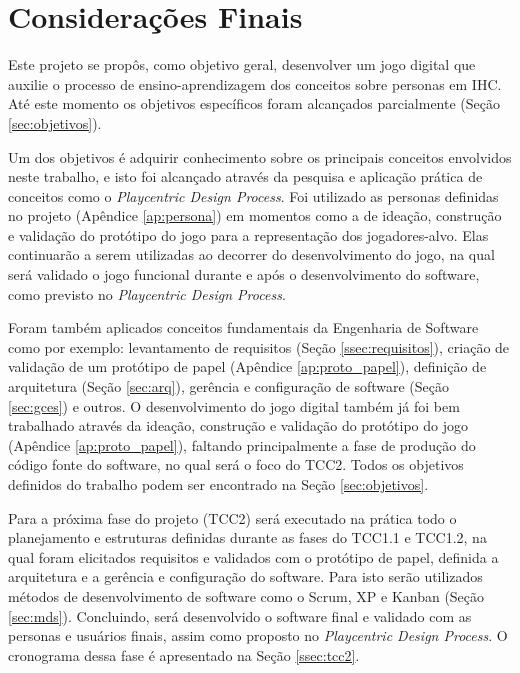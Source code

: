 {\color{textadded}
\chapter{Considerações Finais}
\label{chap:cons}

Este projeto se propôs, como objetivo geral, desenvolver um jogo digital que auxilie o processo de ensino-aprendizagem dos conceitos sobre personas em IHC. Até este momento os objetivos específicos foram alcançados parcialmente (Seção \ref{sec:objetivos}). 

Um dos objetivos é adquirir conhecimento sobre os principais conceitos envolvidos neste trabalho, e isto foi alcançado através da pesquisa e aplicação prática de conceitos como o \textit{Playcentric Design Process}. Foi utilizado as personas definidas no projeto (Apêndice \ref{ap:persona}) em momentos como a de ideação, construção e validação do protótipo do jogo para a representação dos jogadores-alvo. Elas continuarão a serem utilizadas ao decorrer do desenvolvimento do jogo, na qual será validado o jogo funcional durante e após o desenvolvimento do software, como previsto no \textit{Playcentric Design Process}. 

Foram também aplicados conceitos fundamentais da Engenharia de Software como por exemplo: levantamento de requisitos (Seção \ref{ssec:requisitos}), criação de validação de um protótipo de papel (Apêndice \ref{ap:proto_papel}), definição de arquitetura (Seção \ref{sec:arq}), gerência e configuração de software (Seção \ref{sec:gces}) e outros. O desenvolvimento do jogo digital também já foi bem trabalhado através da ideação, construção e validação do protótipo do jogo (Apêndice \ref{ap:proto_papel}), faltando principalmente a fase de produção do código fonte do software, no qual será o foco do TCC2. Todos os objetivos definidos do trabalho podem ser encontrado na Seção \ref{sec:objetivos}.

Para a próxima fase do projeto (TCC2) será executado na prática todo o planejamento e estruturas definidas durante as fases do TCC1.1 e TCC1.2, na qual foram elicitados requisitos e validados com o protótipo de papel, definida a arquitetura e a gerência e configuração do software. Para isto serão utilizados métodos de desenvolvimento de software como o Scrum, XP e Kanban (Seção \ref{sec:mds}). Concluindo, será desenvolvido o software final e validado com as personas e usuários finais, assim como proposto no \textit{Playcentric Design Process}. O cronograma dessa fase é apresentado na Seção \ref{ssec:tcc2}.

}